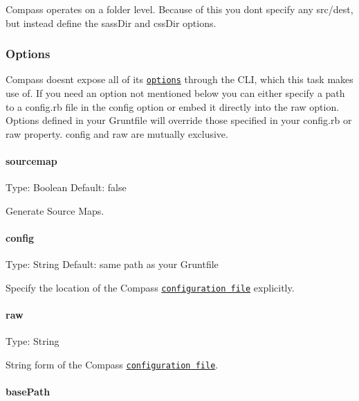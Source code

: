 Compass operates on a folder level. Because of this you don\textquotesingle{}t specify any src/dest, but instead define the {\ttfamily sass\+Dir} and {\ttfamily css\+Dir} options.

\subsubsection*{Options}

Compass doesn\textquotesingle{}t expose all of its \href{http://compass-style.org/help/documentation/configuration-reference/}{\tt options} through the C\+LI, which this task makes use of. If you need an option not mentioned below you can either specify a path to a config.\+rb file in the {\ttfamily config} option or embed it directly into the {\ttfamily raw} option. Options defined in your Gruntfile will override those specified in your config.\+rb or {\ttfamily raw} property. {\ttfamily config} and {\ttfamily raw} are mutually exclusive.

\paragraph*{sourcemap}

Type\+: {\ttfamily Boolean} Default\+: {\ttfamily false}

Generate Source Maps.

\paragraph*{config}

Type\+: {\ttfamily String} Default\+: same path as your Gruntfile

Specify the location of the Compass \href{http://compass-style.org/help/documentation/configuration-reference/}{\tt configuration file} explicitly.

\paragraph*{raw}

Type\+: {\ttfamily String}

String form of the Compass \href{http://compass-style.org/help/documentation/configuration-reference/}{\tt configuration file}.

\paragraph*{base\+Path}

